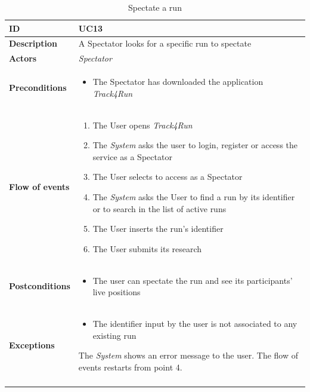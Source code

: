 \documentclass[titlepage]{article}
\begin{document}
 \begin{longtable}{| p{3 cm} | p{10 cm} |} 
			\hline
			{\bf ID} & UC13\\
			\hline
			{\bf Description} & A Spectator looks for a specific run to spectate  \\
			\hline
			{\bf Actors} & {\it Spectator }\\
			\hline
			{\bf Preconditions} & 		
							\begin{itemize}
								\item The Spectator has downloaded the application {\it Track4Run}
							\end{itemize}
			\\
			\hline
			{\bf Flow of events} & 
							\begin{enumerate}
								\item The User opens {\it Track4Run}
\item The {\it System} asks the user to login, register or access the service as a Spectator
\item The User selects to access as a Spectator
\item The {\it System} asks the User to find a run by its identifier or to search in the list of active runs
\item The User inserts the run’s identifier
\item The User submits its research
							\end{enumerate}			
			 \\
			\hline
			{\bf Postconditions} & 
							\begin{itemize}
								\item The user can spectate the run and see its participants’ live positions

							\end{itemize}
			\\
			\hline
			{\bf Exceptions} & 
							\begin{itemize}
								\item The identifier input by the user is not associated to any existing run
							\end{itemize}
							The {\it System} shows an error message to the user. The flow of events restarts from point 4.					
			\\
			\hline
			\caption{Spectate a run}
			\end{longtable}

		
\end{document}
